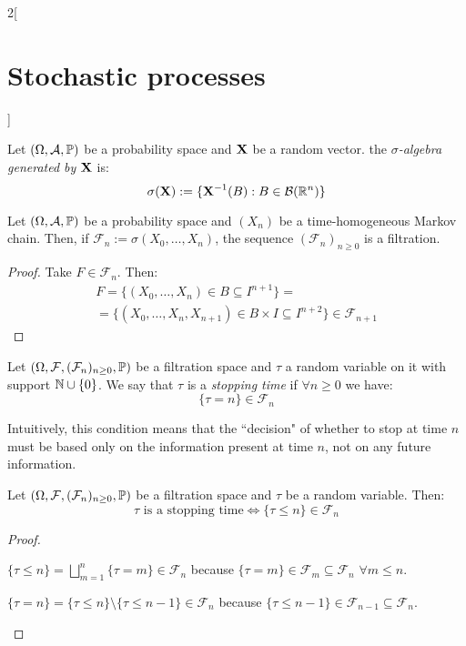 \documentclass[../../../main_math.tex]{subfiles}
\begin{document}
\begin{multicols}{2}[\section{Stochastic processes}]
\begin{definition}
  \end{definition}
  \begin{definition}
    Let $(\Omega,\mathcal{A},\mathbb{P})$ be a probability space and $\boldsymbol{\mathrm{X}}$ be a random vector. the \emph{$\sigma$-algebra generated by $\boldsymbol{\mathrm{X}}$} is:
    $$\sigma(\boldsymbol{\mathrm{X}}):=\{\boldsymbol{\mathrm{X}}^{-1}(B):B\in\mathcal{B}(\mathbb{R}^n)\}$$
  \end{definition}
  \begin{proposition}
    Let $(\Omega,\mathcal{A},\mathbb{P})$ be a probability space and $(X_n)$ be a time-homogeneous Markov chain. Then, if $\mathcal{F}_n:=\sigma(X_0,\ldots,X_n)$, the sequence $(\mathcal{F}_n)_{n\geq 0}$ is a filtration.
  \end{proposition}
  \begin{proof}
    Take $F\in\mathcal{F}_n$. Then:
    \begin{multline*}
      F=\{(X_0,\ldots,X_n)\in B\subseteq I^{n+1}\}=\\=\{(X_0,\ldots,X_n,X_{n+1})\in B\times I\subseteq I^{n+2}\}\in\mathcal{F}_{n+1}
    \end{multline*}
  \end{proof}
  \begin{definition}
    Let $(\Omega,\mathcal{F},(\mathcal{F}_n)_{n\geq 0},\mathbb{P})$ be a filtration space and $\tau$ a random variable on it with support $\mathbb{N}\cup\{0\}$. We say that $\tau$ is a \emph{stopping time} if $\forall n\geq 0$ we have:
    $$\{\tau= n\}\in\mathcal{F}_n$$
  \end{definition}
  \begin{remark}
    Intuitively, this condition means that the ``decision" of whether to stop at time $n$ must be based only on the information present at time $n$, not on any future information.
  \end{remark}
  \begin{lemma}
    Let $(\Omega,\mathcal{F},(\mathcal{F}_n)_{n\geq 0},\mathbb{P})$ be a filtration space and $\tau$ be a random variable. Then:
    $$\tau\text{ is a stopping time}\iff\{\tau\leq n\}\in\mathcal{F}_n$$
  \end{lemma}
  \begin{proof}
    \begin{itemizeiff}
      $\displaystyle\{\tau\leq n\}=\bigsqcup_{m=1}^n\{\tau=m\}\in \mathcal{F}_n$
      because $\{\tau=m\}\in \mathcal{F}_{m}\subseteq \mathcal{F}_{n}$ $\forall m\leq n$.
      \item $\displaystyle\{\tau = n\}=\{\tau\leq n\}\setminus\{\tau\leq n-1\}\in \mathcal{F}_n$
      because $\{\tau\leq n-1\}\in \mathcal{F}_{n-1}\subseteq \mathcal{F}_{n}$.

\end{itemizeiff}
\end{proof}
\end{multicols}
\end{document}

